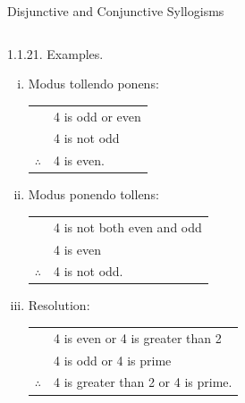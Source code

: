 \documentclass[smaller,hyperref={CJKbookmarks=true}]{beamer}
\begin{document}
\begin{frame}{Disjunctive and Conjunctive Syllogisms}
\begin{spacing}{1.05}
\begin{center}
\begin{tabular}{cc}
  \bottomrule
  \end{tabular}
\end{center}
\newpage
\alert{1.1.21. Examples.}
\begin{enumerate}[(i)]
  \item Modus tollendo ponens:
  \begin{center}
    \begin{tabular}{cl}
       & 4 is odd or even\\
       & 4 is not odd \\ \cmidrule{2-2}
      $\therefore$ & 4 is even. \\
    \end{tabular}
  \end{center}
  \item Modus ponendo tollens:
  \begin{center}
    \begin{tabular}{cl}
       & 4 is not both even and odd \\
       & 4 is even \\ \cmidrule{2-2}
      $\therefore$ & 4 is not odd. \\
    \end{tabular}
  \end{center}
  \item Resolution:
  \begin{center}
    \begin{tabular}{cl}
       & 4 is even or 4 is greater than 2 \\
       & 4 is odd or 4 is prime \\ \cmidrule{2-2}
      $\therefore$ & 4 is greater than 2 or 4 is prime. \\
    \end{tabular}
  \end{center}
\end{enumerate}
\end{spacing}
\end{frame}
\end{document}
